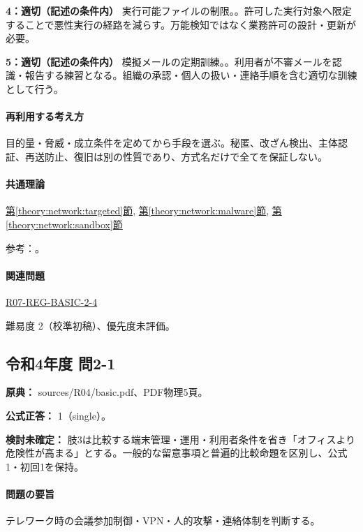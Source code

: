 \noindent\textbf{4：適切（記述の条件内）} 実行可能ファイルの制限。。許可した実行対象へ限定することで悪性実行の経路を減らす。万能検知ではなく業務許可の設計・更新が必要。\par

\noindent\textbf{5：適切（記述の条件内）} 模擬メールの定期訓練。。利用者が不審メールを認識・報告する練習となる。組織の承認・個人の扱い・連絡手順を含む適切な訓練として行う。\par

\paragraph{再利用する考え方} 目的量・脅威・成立条件を定めてから手段を選ぶ。秘匿、改ざん検出、主体認証、再送防止、復旧は別の性質であり、方式名だけで全てを保証しない。

\paragraph{共通理論} \hyperref[theory:network:targeted]{第\ref*{theory:network:targeted}節}, \hyperref[theory:network:malware]{第\ref*{theory:network:malware}節}, \hyperref[theory:network:sandbox]{第\ref*{theory:network:sandbox}節}

\par 参考：\cite{net_target2020,net_target2023}。

\paragraph{関連問題} \hyperref[q:r07-reg-basic-2-4]{R07-REG-BASIC-2-4}

\par 難易度 2（校準初稿）、優先度未評価。

\subsection{令和4年度 問2-1}
\label{q:r04-reg-basic-2-1}

\noindent\textbf{原典：} sources/R04/basic.pdf、PDF物理5頁。

\textbf{公式正答：} 1（single）。

\par\textbf{検討未確定：} 肢3は比較する端末管理・運用・利用者条件を省き「オフィスより危険性が高まる」とする。一般的な留意事項と普遍的比較命題を区別し、公式1・初回1を保持。

\paragraph{問題の要旨} テレワーク時の会議参加制御・VPN・人的攻撃・連絡体制を判断する。

